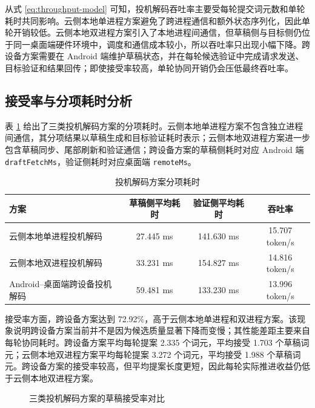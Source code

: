 从式 \eqref{eq:throughput-model} 可知，投机解码吞吐率主要受每轮提交词元数和单轮耗时共同影响。云侧本地单进程方案避免了跨进程通信和额外状态序列化，因此单轮开销较低。云侧本地双进程方案引入了本地进程间通信，但草稿侧与目标侧仍位于同一桌面端硬件环境中，调度和通信成本较小，所以吞吐率只出现小幅下降。跨设备方案需要在 Android 端维护草稿状态，并在每轮候选验证中完成请求发送、目标验证和结果回传；即使接受率较高，单轮协同开销仍会压低最终吞吐率。

\subsection{接受率与分项耗时分析}

表 \ref{tab:timing-main} 给出了三类投机解码方案的分项耗时。云侧本地单进程方案不包含独立进程间通信，其分项结果以草稿生成和目标验证耗时表示；云侧本地双进程方案进一步包含草稿同步、尾部刷新和验证通信；跨设备方案的草稿侧耗时对应 Android 端 \texttt{draftFetchMs}，验证侧耗时对应桌面端 \texttt{remoteMs}。

\begin{table}[htbp]
  \centering
  \caption{投机解码方案分项耗时}
  \label{tab:timing-main}
  \scriptsize
  \setlength{\tabcolsep}{3pt}
  \begin{tabularx}{0.98\textwidth}{Xccc}
    \toprule
    方案 & 草稿侧平均耗时 & 验证侧平均耗时 & 吞吐率 \\
    \midrule
    云侧本地单进程投机解码 & 27.445 ms & 141.630 ms & 15.707 token/s \\
    云侧本地双进程投机解码 & 33.231 ms & 154.827 ms & 14.816 token/s \\
    Android--桌面端跨设备投机解码 & 59.481 ms & 133.230 ms & 13.996 token/s \\
    \bottomrule
  \end{tabularx}
\end{table}

接受率方面，跨设备方案达到 72.92\%，高于云侧本地单进程和双进程方案。该现象说明跨设备方案当前并不是因为候选质量显著下降而变慢；其性能差距主要来自每轮协同耗时。跨设备方案平均每轮提案 2.335 个词元，平均接受 1.703 个草稿词元；云侧本地双进程方案平均每轮提案 3.272 个词元，平均接受 1.988 个草稿词元。跨设备方案的接受率较高，但平均提案长度更短，因此每轮实际推进收益仍低于云侧本地双进程方案。

\begin{figure}[htbp]
  \centering
  \caption{三类投机解码方案的草稿接受率对比}
  \label{fig:accept-compare}
\end{figure}

